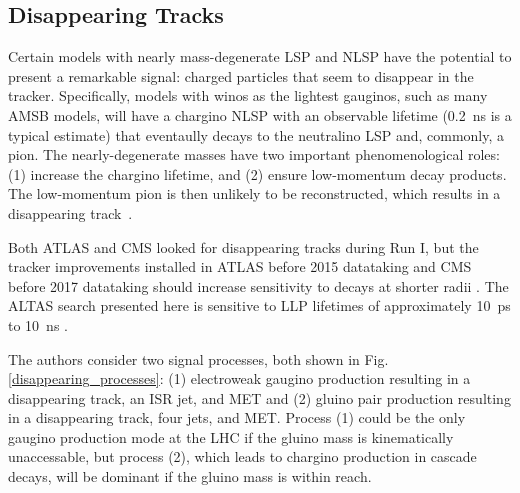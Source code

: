 \documentclass[12pt]{article}
\begin{document}
    \subsection{Disappearing Tracks}
        Certain models with nearly mass-degenerate LSP and NLSP have the potential to present a remarkable signal: charged particles that seem to disappear in the tracker. Specifically, models with winos as the lightest gauginos, such as many AMSB models, will have a chargino NLSP with an observable lifetime (\SI{0.2}{\nano\s} is a typical estimate) that eventaully decays to the neutralino LSP and, commonly, a pion. The nearly-degenerate masses have two important phenomenological roles: (1) increase the chargino lifetime, and (2) ensure low-momentum decay products. The low-momentum pion is then unlikely to be reconstructed, which results in a disappearing track~\cite{atlas_disappearing}.

        Both ATLAS and CMS looked for disappearing tracks during Run I, but the tracker improvements installed in ATLAS before 2015 datataking and CMS before 2017 datataking should increase sensitivity to decays at shorter radii . The ALTAS search presented here is sensitive to LLP lifetimes of approximately \SI{10}{\pico\s} to \SI{10}{\nano\s} .

        The authors consider two signal processes, both shown in Fig.\ref{disappearing_processes}: (1) electroweak gaugino production resulting in a disappearing track, an ISR jet, and MET and (2) gluino pair production resulting in a disappearing track, four jets, and MET. Process (1) could be the only gaugino production mode at the LHC if the gluino mass is kinematically unaccessable, but process (2), which leads to chargino production in cascade decays, will be dominant if the gluino mass is within reach.
\end{document}
